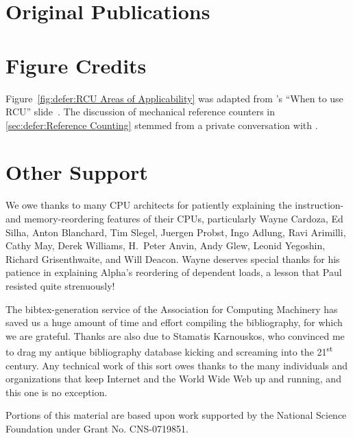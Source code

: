 \section{Original Publications}

\ListOriginalPublications

\section{Figure Credits}

\ListContributions

Figure~\ref{fig:defer:RCU Areas of Applicability} was adapted from
's ``When to use RCU'' slide~\cite{FedorPikus2017RCUthenWhat}.
The discussion of mechanical reference counters in
\cref{sec:defer:Reference Counting}
stemmed from a private conversation with .

\section{Other Support}

We owe thanks to many CPU architects for patiently explaining the
instruction- and memory-reordering features of their CPUs, particularly
Wayne Cardoza, Ed Silha, Anton Blanchard, Tim Slegel, Juergen Probst,
Ingo Adlung, Ravi Arimilli, Cathy May, Derek Williams,
H.~Peter Anvin,
Andy Glew, Leonid Yegoshin,
Richard Grisenthwaite, and Will Deacon.
Wayne deserves special thanks for his patience in explaining Alpha's reordering
of dependent loads, a lesson that Paul resisted quite strenuously!

The bibtex-generation service of the Association for Computing Machinery
has saved us a huge amount of time and effort compiling the bibliography,
for which we are grateful.
Thanks are also due to Stamatis Karnouskos, who convinced me to drag my
antique bibliography database kicking and screaming into the
21\textsuperscript{st} century.
Any technical work of this sort owes thanks to the many individuals and
organizations that keep Internet and the World Wide Web up and running,
and this one is no exception.

Portions of this material are based upon work supported by the National
Science Foundation under Grant No. CNS-0719851.
